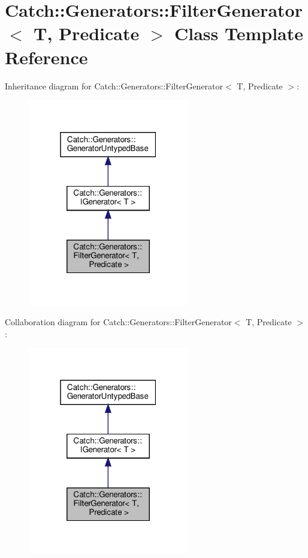 \hypertarget{classCatch_1_1Generators_1_1FilterGenerator}{}\section{Catch\+:\+:Generators\+:\+:Filter\+Generator$<$ T, Predicate $>$ Class Template Reference}
\label{classCatch_1_1Generators_1_1FilterGenerator}


Inheritance diagram for Catch\+:\+:Generators\+:\+:Filter\+Generator$<$ T, Predicate $>$\+:
\nopagebreak
\begin{figure}[H]
\begin{center}
\leavevmode
\includegraphics[width=199pt]{classCatch_1_1Generators_1_1FilterGenerator__inherit__graph}
\end{center}
\end{figure}


Collaboration diagram for Catch\+:\+:Generators\+:\+:Filter\+Generator$<$ T, Predicate $>$\+:
\nopagebreak
\begin{figure}[H]
\begin{center}
\leavevmode
\includegraphics[width=199pt]{classCatch_1_1Generators_1_1FilterGenerator__coll__graph}
\end{center}
\end{figure}
